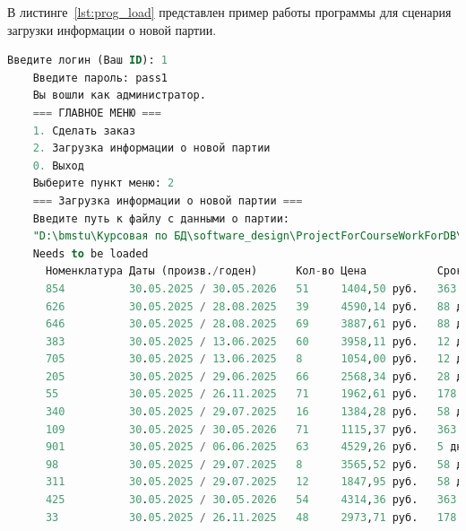В листинге~\ref{lst:prog_load} представлен пример работы программы для сценария загрузки информации о новой партии. 
\begin{lstlisting}[label=lst:prog_load, caption=Загрузка информации о новой партии товара, language=SQL]
	Введите логин (Ваш ID): 1
	Введите пароль: pass1
	Вы вошли как администратор.
	=== ГЛАВНОЕ МЕНЮ ===
	1. Сделать заказ
	2. Загрузка информации о новой партии
	0. Выход
	Выберите пункт меню: 2
	=== Загрузка информации о новой партии ===
	Введите путь к файлу с данными о партии:
	"D:\bmstu\Курсовая по БД\software_design\ProjectForCourseWorkForDB\FlowerShop\batch4.txt"
	Needs to be loaded
	  Номенклатура Даты (произв./годен)      Кол-во Цена           Срок годности   
	  854          30.05.2025 / 30.05.2026   51     1404,50 руб.   363 дней        
	  626          30.05.2025 / 28.08.2025   39     4590,14 руб.   88 дней        
	  646          30.05.2025 / 28.08.2025   69     3887,61 руб.   88 дней        
	  383          30.05.2025 / 13.06.2025   60     3958,11 руб.   12 дней        
	  705          30.05.2025 / 13.06.2025   8      1054,00 руб.   12 дней        
	  205          30.05.2025 / 29.06.2025   66     2568,34 руб.   28 дней        
	  55           30.05.2025 / 26.11.2025   71     1962,61 руб.   178 дней        
	  340          30.05.2025 / 29.07.2025   16     1384,28 руб.   58 дней        
	  109          30.05.2025 / 30.05.2026   71     1115,37 руб.   363 дней        
	  901          30.05.2025 / 06.06.2025   63     4529,26 руб.   5 дней        
	  98           30.05.2025 / 29.07.2025   8      3565,52 руб.   58 дней        
	  311          30.05.2025 / 29.07.2025   12     1847,95 руб.   58 дней        
	  425          30.05.2025 / 30.05.2026   54     4314,36 руб.   363 дней        
	  33           30.05.2025 / 26.11.2025   48     2973,71 руб.   178 дней        


\end{lstlisting}
